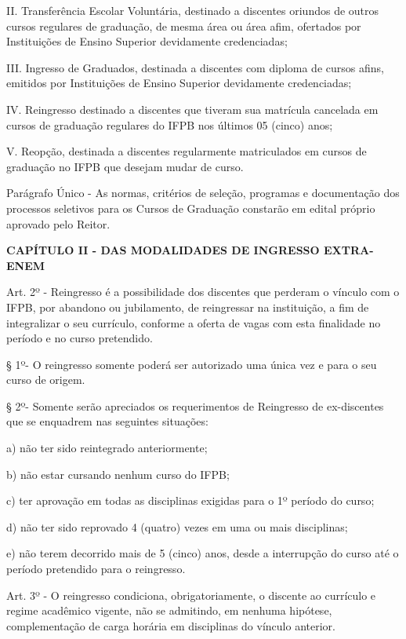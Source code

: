 II. Transferência Escolar Voluntária, destinado a discentes oriundos de outros cursos regulares de graduação, de mesma área ou área afim, ofertados por Instituições de Ensino Superior devidamente credenciadas;

III. Ingresso de Graduados, destinada a discentes com diploma de cursos afins, emitidos por Instituições de Ensino Superior devidamente credenciadas;

IV. Reingresso destinado a discentes que tiveram sua matrícula cancelada em cursos de graduação regulares do IFPB nos últimos 05 (cinco) anos;

V. Reopção, destinada a discentes regularmente matriculados em cursos de graduação no IFPB que desejam mudar de curso.


Parágrafo Único - As normas, critérios de seleção, programas e documentação dos processos seletivos para os Cursos de Graduação constarão em edital próprio aprovado pelo Reitor.

\vspace{4mm}
\textbf{CAPÍTULO II - DAS MODALIDADES DE INGRESSO EXTRA-ENEM}
\vspace{4mm}

\vspace{1mm}
Art. 2º - Reingresso é a possibilidade dos discentes que perderam o vínculo com o IFPB, por abandono ou jubilamento, de reingressar na instituição, a fim de integralizar o seu currículo, conforme a oferta de vagas com esta finalidade no período e no curso pretendido.

	§ 1º- O reingresso somente poderá ser autorizado uma única vez e para o seu curso de origem.

	§ 2º- Somente serão apreciados os requerimentos de Reingresso de ex-discentes que se enquadrem nas seguintes situações:

 a)	não ter sido reintegrado anteriormente;

 b)	não estar cursando nenhum curso do IFPB;

 c)	ter aprovação em todas as disciplinas exigidas para o 1º período do curso;

 d)	não ter sido reprovado 4 (quatro) vezes em uma ou mais disciplinas;

 e)	não terem decorrido mais de 5 (cinco) anos, desde a interrupção do curso até o período pretendido para o reingresso.

\vspace{1mm}
Art. 3º - O reingresso condiciona, obrigatoriamente, o discente ao currículo e regime acadêmico vigente, não se admitindo, em nenhuma hipótese, complementação de carga horária em disciplinas do vínculo anterior.

